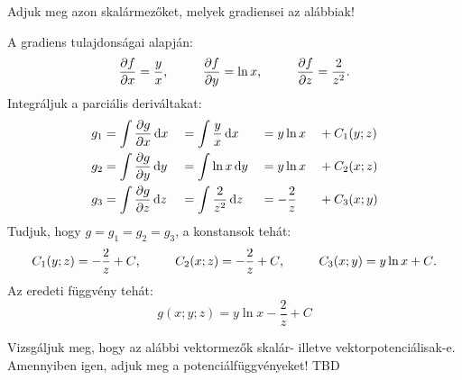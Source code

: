 \documentclass[lang=magyar]{math-handout}
\begin{document}
\begin{exercise}{Adjuk meg azon skalármezőket, melyek gradiensei az alábbiak!}
{\begin{enumerate}[a)]
            \vspace{3mm}
            A gradiens tulajdonságai alapján:
            \[
              \pdv{f}{x} = \frac{y}{x}
              \text,\hspace{1cm}
              \pdv{f}{y} = \ln x
              \text,\hspace{1cm}
              \pdv{f}{z} = \frac{2}{z^2}
              \text.
            \]
            Integráljuk a parciális deriváltakat:
            \begin{alignat*}{9}
              g_1 &  = \int \pdv{g}{x} \,\mathrm{d} x
                  && = \int \frac{y}{x} \,\mathrm{d} x
                  && = y \ln x
                  && + C_1(y;z)
              \\
              g_2 &  = \int \pdv{g}{y} \,\mathrm{d} y
                  && = \int \ln x \,\mathrm{d} y
                  && = y \ln x
                  && + C_2(x;z)
              \\
              g_3 &  = \int \pdv{g}{z} \,\mathrm{d} z
                  && = \int \frac{2}{z^2} \,\mathrm{d} z
                  && = - \frac{2}{z}
                  && + C_3(x;y)
            \end{alignat*}
            Tudjuk, hogy $g = g_1 = g_2 = g_3$, a konstansok tehát:
            \[
              C_1(y;z) = - \frac{2}{z} + C
              \text,\hspace{1cm}
              C_2(x;z) = - \frac{2}{z} + C
              \text,\hspace{1cm}
              C_3(x;y) = y \ln x + C
              \text.
            \]
            Az eredeti függvény tehát:
            \[
              g(x;y;z) = y \ln x - \frac{2}{z} + C
            \]
    \end{enumerate}
  }
\end{exercise}

\begin{exercise}{%
    Vizsgáljuk meg, hogy az alábbi vektormezők skalár- illetve
    vektorpotenciálisak-e. Amennyiben igen, adjuk meg a potenciálfüggvényeket!
  }
  TBD
\end{exercise}
\end{document}
